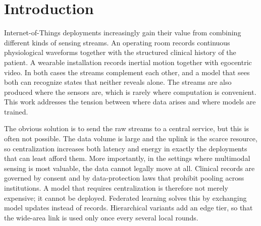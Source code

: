 %
%
%
%

\section{Introduction}
\label{sec:intro}

Internet-of-Things deployments increasingly gain their value from combining
different kinds of sensing streams. An operating room records continuous
physiological waveforms together with the structured clinical history of the
patient. A wearable installation records inertial motion together with
egocentric video. In both cases the streams complement each other, and a model
that sees both can recognize states that neither reveals alone. The streams are
also produced where the sensors are, which is rarely where computation is
convenient. This work addresses the tension between where data arises and
where models are trained.

The obvious solution is to send the raw streams to a central service, but this
is often not possible. The data volume is large and the uplink is the scarce
resource, so centralization increases both latency and energy in exactly the
deployments that can least afford them. More importantly, in the settings where
multimodal sensing is most valuable, the data cannot legally move at all.
Clinical records are governed by consent and by data-protection laws that
prohibit pooling across institutions. A model that requires centralization is
therefore not merely expensive; it cannot be deployed. Federated learning
\cite{ref1} solves this by exchanging model updates instead of records.
Hierarchical variants \cite{ref2, ref3} add an edge tier, so that the wide-area
link is used only once every several local rounds.

